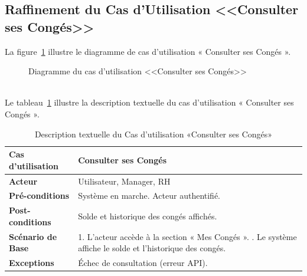 \subsection{Raffinement du Cas d'Utilisation <<Consulter ses Congés>>}
La figure~\ref{fig:usecase_view_leaves} illustre le diagramme de cas d'utilisation « Consulter ses Congés ».
\begin{figure}[h]
     \centering
     \caption{Diagramme du cas d'utilisation <<Consulter ses Congés>>}
     \label{fig:usecase_view_leaves}
\end{figure}\\
Le tableau~\ref{tab:view_leaves} illustre la description textuelle du cas d’utilisation « Consulter ses Congés ».
\begin{table}[!ht]
\centering
\caption{Description textuelle du Cas d’utilisation «Consulter ses Congés»}
\label{tab:view_leaves}
\renewcommand{\arraystretch}{1.2}
\begin{tabular}{|p{4.2cm}|p{11cm}|}
\hline
\textbf{Cas d'utilisation} & Consulter ses Congés \\
\hline
\textbf{Acteur} & Utilisateur, Manager, RH \\
\hline
\textbf{Pré-conditions} & Système en marche. \newline Acteur authentifié. \\
\hline
\textbf{Post-conditions} & Solde et historique des congés affichés. \\
\hline
\textbf{Scénario de Base} & 
1. L’acteur accède à la section « Mes Congés ». \newline
2. Le système affiche le solde et l’historique des congés. \\
\hline
\textbf{Exceptions} & 
Échec de consultation (erreur API). \\
\hline
\end{tabular}
\end{table}
\newpage
